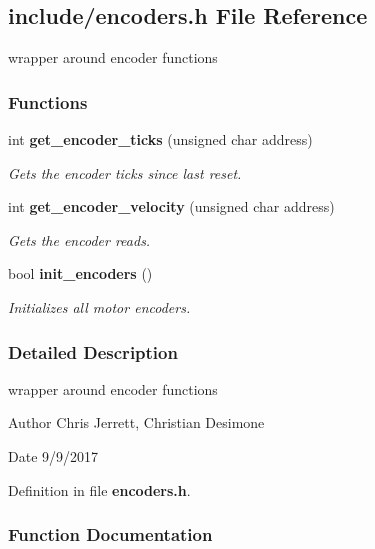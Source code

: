 \subsection{include/encoders.h File Reference}
\label{encoders_8h}


wrapper around encoder functions  


\subsubsection*{Functions}
\begin{DoxyCompactItemize}
\item 
int \textbf{ get\+\_\+encoder\+\_\+ticks} (unsigned char address)
\begin{DoxyCompactList}\small\item\em Gets the encoder ticks since last reset. \end{DoxyCompactList}\item 
int \textbf{ get\+\_\+encoder\+\_\+velocity} (unsigned char address)
\begin{DoxyCompactList}\small\item\em Gets the encoder reads. \end{DoxyCompactList}\item 
bool \textbf{ init\+\_\+encoders} ()
\begin{DoxyCompactList}\small\item\em Initializes all motor encoders. \end{DoxyCompactList}\end{DoxyCompactItemize}


\subsubsection{Detailed Description}
wrapper around encoder functions 

\begin{DoxyAuthor}{Author}
Chris Jerrett, Christian Desimone 
\end{DoxyAuthor}
\begin{DoxyDate}{Date}
9/9/2017 
\end{DoxyDate}


Definition in file \textbf{ encoders.\+h}.



\subsubsection{Function Documentation}
\mbox{\label{encoders_8h_aed261dd4dae33a48c42f2e363c84760f}} 
